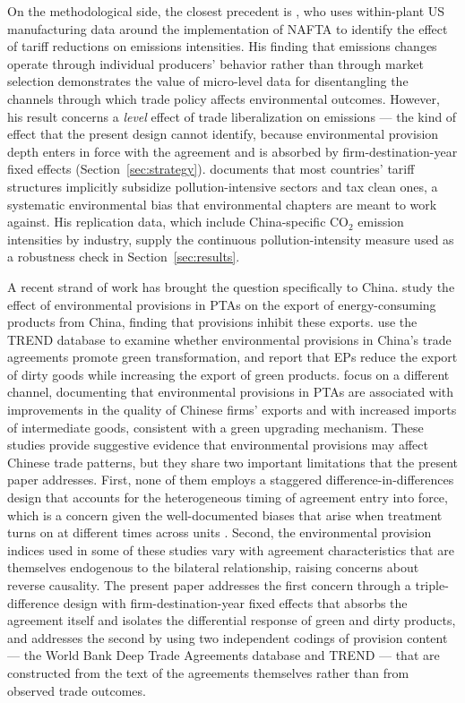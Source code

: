 \documentclass[12pt]{article}
\begin{document}
On the methodological side, the closest precedent is \citet{cherniwchan2017}, who uses within-plant US manufacturing data around the implementation of NAFTA to identify the effect of tariff reductions on emissions intensities. His finding that emissions changes operate through individual producers' behavior rather than through market selection demonstrates the value of micro-level data for disentangling the channels through which trade policy affects environmental outcomes. However, his result concerns a \emph{level} effect of trade liberalization on emissions --- the kind of effect that the present design cannot identify, because environmental provision depth enters in force with the agreement and is absorbed by firm-destination-year fixed effects (Section~\ref{sec:strategy}). \citet{shapiro2021} documents that most countries' tariff structures implicitly subsidize pollution-intensive sectors and tax clean ones, a systematic environmental bias that environmental chapters are meant to work against. His replication data, which include China-specific CO$_2$ emission intensities by industry, supply the continuous pollution-intensity measure used as a robustness check in Section~\ref{sec:results}.

A recent strand of work has brought the question specifically to China. \citet{yue2024} study the effect of environmental provisions in PTAs on the export of energy-consuming products from China, finding that provisions inhibit these exports. \citet{zhusun2026} use the TREND database to examine whether environmental provisions in China's trade agreements promote green transformation, and report that EPs reduce the export of dirty goods while increasing the export of green products. \citet{zhusun2025} focus on a different channel, documenting that environmental provisions in PTAs are associated with improvements in the quality of Chinese firms' exports and with increased imports of intermediate goods, consistent with a green upgrading mechanism. These studies provide suggestive evidence that environmental provisions may affect Chinese trade patterns, but they share two important limitations that the present paper addresses. First, none of them employs a staggered difference-in-differences design that accounts for the heterogeneous timing of agreement entry into force, which is a concern given the well-documented biases that arise when treatment turns on at different times across units \citep{goodmanbacon2021, callaway2021, dechaisemartin2020}. Second, the environmental provision indices used in some of these studies vary with agreement characteristics that are themselves endogenous to the bilateral relationship, raising concerns about reverse causality. The present paper addresses the first concern through a triple-difference design with firm-destination-year fixed effects that absorbs the agreement itself and isolates the differential response of green and dirty products, and addresses the second by using two independent codings of provision content --- the World Bank Deep Trade Agreements database and TREND --- that are constructed from the text of the agreements themselves rather than from observed trade outcomes.
\end{document}
